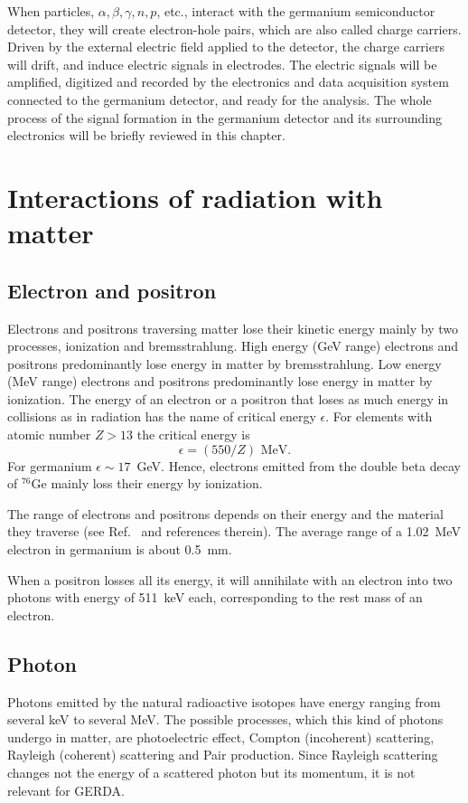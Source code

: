 When particles, $\alpha, \beta, \gamma, n, p$, etc., interact with the germanium semiconductor detector, they will create electron-hole pairs, which are also called charge carriers. Driven by the external electric field applied to the detector, the charge carriers will drift, and induce electric signals in electrodes. The electric signals will be amplified, digitized and recorded by the electronics and data acquisition system connected to the germanium detector, and ready for the analysis. The whole process of the signal formation in the germanium detector and its surrounding electronics will be briefly reviewed in this chapter.

\section{Interactions of radiation with matter}
\label{sec:det:phys}
\subsection{Electron and positron}
\label{sec:det:ep}
Electrons and positrons traversing matter lose their kinetic energy mainly by two processes, ionization and bremsstrahlung. High energy (GeV range) electrons and positrons predominantly lose energy in matter by bremsstrahlung. Low energy (MeV range) electrons and positrons predominantly lose energy in matter by ionization. The energy of an electron or a positron that loses as much energy in collisions as in radiation has the name of critical energy $\epsilon$. For elements with atomic number $Z > 13$ the critical energy is~\cite{Ama81}
\begin{equation}
  \label{eq:det:ecrit}
  \epsilon = (550/Z) \text{ MeV}.
\end{equation}
For germanium $\epsilon \sim 17$~GeV. Hence, electrons emitted from the double beta decay of $^{76}$Ge mainly loss their energy by ionization.

The range of electrons and positrons depends on their energy and the material they traverse (see Ref.~\cite{Bri84} and references therein). The average range of a 1.02~MeV electron in germanium is about 0.5~mm.

When a positron losses all its energy, it will annihilate with an electron into two photons with energy of 511~keV each, corresponding to the rest mass of an electron.

\subsection{Photon}
\label{sec:det:gamma}
Photons emitted by the natural radioactive isotopes have energy ranging from several keV to several MeV. The possible processes, which this kind of photons undergo in matter, are photoelectric effect, Compton (incoherent) scattering, Rayleigh (coherent) scattering and Pair production. Since Rayleigh scattering changes not the energy of a scattered photon but its momentum, it is not relevant for GERDA.

